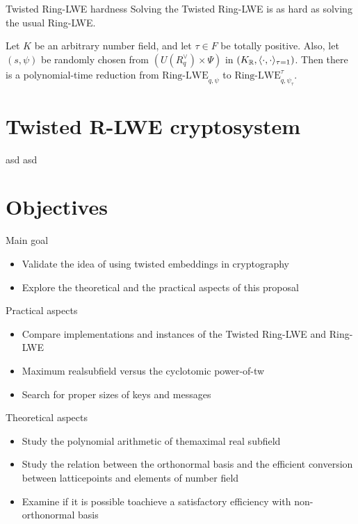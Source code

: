 \documentclass[notheorems, bigger]{beamer}
\begin{document}
\begin{frame}[label={sec:org950751d}]{Twisted Ring-LWE hardness}
Solving the Twisted Ring-LWE is as hard as solving the usual Ring-LWE.
\begin{theorem}
  \label{theorem:twisted-ring-lwe-hardness}
  Let $K$ be an arbitrary number field, and let $\tau \in F$ be totally positive.
  Also, let $(s,\psi)$ be randomly chosen from $(U(R_q^\vee)\times \Psi)$ in $(K_{\mathbb{R}},\langle{\cdot,\cdot}\rangle_{\tau=1})$.
  Then there is a polynomial-time reduction from $\mbox{Ring-LWE}_{q,\psi}$ to $\mbox{Ring-LWE}^\tau_{q,\psi_\tau}$.
\end{theorem}
\end{frame}
\section{Twisted R-LWE cryptosystem}
\label{sec:orgd777b25}
\begin{frame}[label={sec:org224dae2}]{asd}
asd
\end{frame}
\section{Objectives}
\label{sec:org84b3b99}
\begin{frame}[label={sec:org4f4d8fa}]{Main goal}
\begin{itemize}
\item Validate the idea of using twisted embeddings in cryptography
\item Explore the theoretical and the practical aspects of this proposal
\end{itemize}
\end{frame}
\begin{frame}[label={sec:org488db8f}]{Practical aspects}
\begin{itemize}
\item Compare implementations and instances of the Twisted Ring-LWE and Ring-LWE
\item Maximum realsubfield versus the cyclotomic power-of-tw
\item Search for proper sizes of keys and messages
\end{itemize}
\end{frame}
\begin{frame}[label={sec:orgd7016a0}]{Theoretical aspects}
\begin{itemize}
\item Study the polynomial arithmetic of themaximal real subfield
\item Study the relation between the orthonormal basis and the efficient conversion between latticepoints and elements of number field
\item Examine if it is possible toachieve a satisfactory efficiency with non-orthonormal basis
\end{itemize}
\end{frame}
\end{document}
